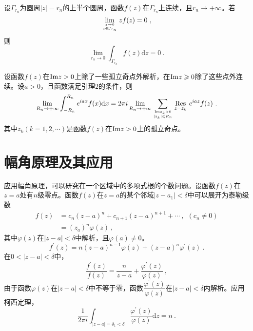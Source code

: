 \documentclass[12pt,a4paper]{article}
\newcommand{\dif}{\mathrm{d}}
\begin{document}
\begin{tcolorbox}[colback=green!5,colframe=green!40!black,title= 引理]
设$\Gamma_{r_n}$为圆周$|z| = r_n$的上半个圆周，函数$f(z)$在$\Gamma_{r_n}$上连续，且$r_n \rightarrow +\infty$。若
\begin{equation}
\lim\limits_{z\rightarrow 0 \atop z \in \Gamma_{r_n} } z f(z) = 0  ~,
\end{equation}
则
\begin{equation}
\lim\limits_{r_n \rightarrow 0} \int_{\Gamma_{r_n} }  f(z) \dif z = 0  ~.
\end{equation}
\end{tcolorbox}


\begin{tcolorbox}[colback=green!5,colframe=green!40!black,title= 定理]
设函数$f(z)$在${\rm Im} z > 0$上除了一些孤立奇点外解析，在${\rm Im} z\geqslant 0$除了这些点外连续。设$a > 0$，且函数满足引理$2$的条件，则
\begin{equation}
\lim\limits_{R_n\rightarrow +\infty } \int_{-R_n}^{R_n} e^{iax} f(x) \dif x = 2\pi i \lim\limits_{R_n \rightarrow +\infty} \sum_{{\rm Im} z_k >  0 \atop |z_k| \leqslant R_n } \underset{z = z_k}{\rm Res}~ e^{iaz} f(z) ~.
\end{equation}
其中$z_k(k=1,2,\cdots)$是函数$f(z)$在${\rm Im} z > 0$上的孤立奇点。
\end{tcolorbox}

\section{幅角原理及其应用}
应用幅角原理，可以研究在一个区域中的多项式根的个数问题。设函数$f(z)$在$z=a$处有$n$级零点。函数$f(z)$在$z=a$的某个邻域$|z-a_1|< \delta$中可以展开为泰勒级数
\begin{align}
f(z) &= c_n(z-a)^n +c_{n+1}(z-a)^{n+1} +\cdots ~, ~~ (c_n \neq 0) \\
&= (z_a)^n \varphi(z) ~,
\end{align}
其中$\varphi(z)$在$|z-a| < \delta$中解析，且$\varphi(a) \neq 0$。
\begin{equation}
f^\prime(z) = n(z-a)^{n-1} \varphi(z) +(z-a)^n \varphi^\prime(z) ~.
\end{equation}
在$0 < |z-a| < \delta$中，
\begin{equation*}
\dfrac{f^\prime(z)}{f(z)} = \dfrac{n}{z-a} +\dfrac{\varphi^\prime(z)}{\varphi(z)} ~,
\end{equation*}
由于函数$\varphi(z)$在$|z-a| < \delta$中不等于零，函数$\dfrac{\varphi^\prime(z)}{\varphi(z)}$在$|z-a| < \delta$内解析。应用柯西定理，
\begin{equation*}
\dfrac{1}{2\pi i} \int_{|z-a| =\delta_1 < \delta} \dfrac{\varphi^\prime(z)}{\varphi(z)} \dif z = n ~.
\end{equation*}
\end{document}

